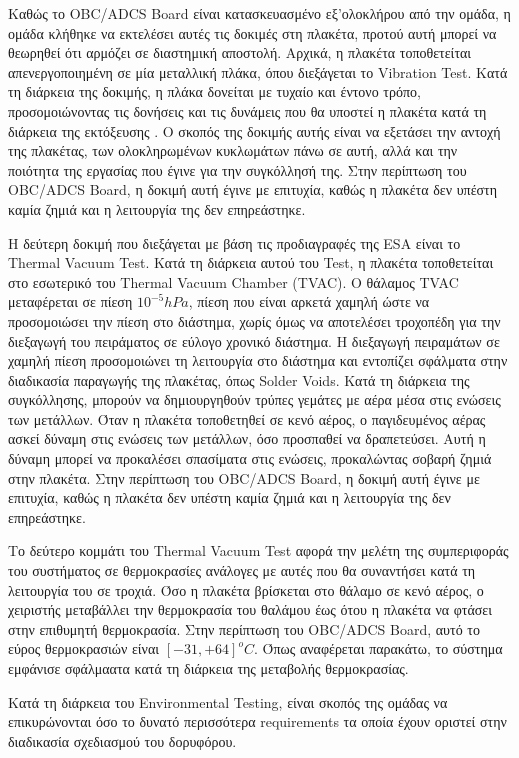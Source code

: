 \documentclass[a4paper,nobib,justified]{tufte-book}
\begin{document}
Καθώς το OBC/ADCS Board είναι κατασκευασμένο εξ'ολοκλήρου από την ομάδα, η ομάδα κλήθηκε να εκτελέσει αυτές τις δοκιμές στη πλακέτα, προτού αυτή μπορεί να θεωρηθεί ότι αρμόζει σε διαστημική αποστολή. Αρχικά, η πλακέτα τοποθετείται απενεργοποιημένη σε μία μεταλλική πλάκα, όπου διεξάγεται το Vibration Test. Κατά τη διάρκεια της δοκιμής, η πλάκα δονείται με τυχαίο και έντονο τρόπο, προσομοιώνοντας τις δονήσεις και τις δυνάμεις που θα υποστεί η πλακέτα κατά τη διάρκεια της εκτόξευσης . Ο σκοπός της δοκιμής αυτής είναι να εξετάσει την αντοχή της πλακέτας, των ολοκληρωμένων κυκλωμάτων πάνω σε αυτή, αλλά και την ποιότητα της εργασίας που έγινε για την συγκόλλησή της. Στην περίπτωση του OBC/ADCS Board, η δοκιμή αυτή έγινε με επιτυχία, καθώς η πλακέτα δεν υπέστη καμία ζημιά και η λειτουργία της δεν επηρεάστηκε.

Η δεύτερη δοκιμή που διεξάγεται με βάση τις προδιαγραφές της ESA είναι το Thermal Vacuum Test. Κατά τη διάρκεια αυτού του Test, η πλακέτα τοποθετείται στο εσωτερικό του Thermal Vacuum Chamber (TVAC). Ο θάλαμος TVAC μεταφέρεται σε πίεση $10^{-5} hPa$, πίεση που είναι αρκετά χαμηλή ώστε να προσομοιώσει την πίεση στο διάστημα, χωρίς όμως να αποτελέσει τροχοπέδη για την διεξαγωγή του πειράματος σε εύλογο χρονικό διάστημα. Η διεξαγωγή πειραμάτων σε χαμηλή πίεση προσομοιώνει τη λειτουργία στο διάστημα και εντοπίζει σφάλματα στην διαδικασία παραγωγής της πλακέτας, όπως Solder Voids. Κατά τη διάρκεια της συγκόλλησης, μπορούν να δημιουργηθούν τρύπες γεμάτες με αέρα μέσα στις ενώσεις των μετάλλων. Όταν η πλακέτα τοποθετηθεί σε κενό αέρος, ο παγιδευμένος αέρας ασκεί δύναμη στις ενώσεις των μετάλλων, όσο προσπαθεί να δραπετεύσει. Αυτή η δύναμη μπορεί να προκαλέσει σπασίματα στις ενώσεις, προκαλώντας σοβαρή ζημιά στην πλακέτα. Στην περίπτωση του OBC/ADCS Board, η δοκιμή αυτή έγινε με επιτυχία, καθώς η πλακέτα δεν υπέστη καμία ζημιά και η λειτουργία της δεν επηρεάστηκε.

Το δεύτερο κομμάτι του Thermal Vacuum Test αφορά την μελέτη της συμπεριφοράς του συστήματος σε θερμοκρασίες ανάλογες με αυτές που θα συναντήσει κατά τη λειτουργία του σε τροχιά. Όσο η πλακέτα βρίσκεται στο θάλαμο σε κενό αέρος, ο χειριστής μεταβάλλει την θερμοκρασία του θαλάμου έως ότου η πλακέτα να φτάσει στην επιθυμητή θερμοκρασία. Στην περίπτωση του OBC/ADCS Board, αυτό το εύρος θερμοκρασιών είναι $[-31,+64] ^o C$. Όπως αναφέρεται παρακάτω, το σύστημα εμφάνισε σφάλμαατα κατά τη διάρκεια της μεταβολής θερμοκρασίας.

Κατά τη διάρκεια του Environmental Testing, είναι σκοπός της ομάδας να επικυρώνονται όσο το δυνατό περισσότερα requirements τα οποία έχουν οριστεί στην διαδικασία σχεδιασμού του δορυφόρου.
\end{document}
